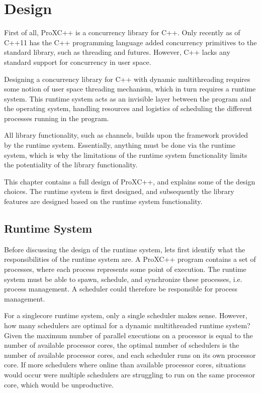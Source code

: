 

\chapter{Design}
\label{ch:design}


First of all, ProXC++ is a concurrency library for C++. Only recently as of C++11 has the C++ programming language added concurrency primitives to the standard library, such as threading and futures. However, C++ lacks any standard support for concurrency in user space. 

Designing a concurrency library for C++ with dynamic multithreading requires some notion of user space threading mechanism, which in turn requires a runtime system. This runtime system acts as an invisible layer between the program and the operating system, handling resources and logistics of scheduling the different processes running in the program. 

All library functionality, such as channels, builds upon the framework provided by the runtime system. Essentially, anything must be done via the runtime system, which is why the limitations of the runtime system functionality limits the potentiality of the library functionality.

This chapter contains a full design of ProXC++, and explains some of the design choices. The runtime system is first designed, and subsequently the library features are designed based on the runtime system functionality. 


\section{Runtime System}


Before discussing the design of the runtime system, lets first identify what the responsibilities of the runtime system are. A ProXC++ program contains a set of processes, where each process represents some point of execution. The runtime system must be able to spawn, schedule, and synchronize these processes, i.e. process management. A scheduler could therefore be responsible for process management. 

For a singlecore runtime system, only a single scheduler makes sense. However, how many schedulers are optimal for a dynamic multithreaded runtime system? Given the maximum number of parallel executions on a processor is equal to the number of available processor cores, the optimal number of schedulers is the number of available processor cores, and each scheduler runs on its own processor core. If more schedulers where online than available processor cores, situations would occur were multiple schedulers are struggling to run on the same processor core, which would be unproductive.

